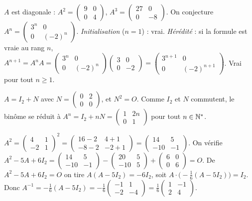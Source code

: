 $A$ est diagonale : $A^2=\begin{pmatrix}9&0\\0&4\end{pmatrix}$, $A^3=\begin{pmatrix}27&0\\0&-8\end{pmatrix}$.
On conjecture $A^n=\begin{pmatrix}3^n&0\\0&(-2)^n\end{pmatrix}$.
\emph{Initialisation} ($n=1$) : vrai. \emph{Hérédité} : si la formule est vraie au rang $n$,
$A^{n+1}=A^n A=\begin{pmatrix}3^n&0\\0&(-2)^n\end{pmatrix}\begin{pmatrix}3&0\\0&-2\end{pmatrix}
=\begin{pmatrix}3^{n+1}&0\\0&(-2)^{n+1}\end{pmatrix}$. Vrai pour tout $n\ge1$.

$A=I_2+N$ avec $N=\begin{pmatrix}0&2\\0&0\end{pmatrix}$, et $N^2=O$. Comme $I_2$ et $N$ commutent,
le binôme se réduit à $A^n=I_2+nN=\begin{pmatrix}1&2n\\0&1\end{pmatrix}$ pour tout $n\in\mathbb{N}^*$.

$A^2=\begin{pmatrix}4&1\\-2&1\end{pmatrix}^2
=\begin{pmatrix}16-2&4+1\\-8-2&-2+1\end{pmatrix}=\begin{pmatrix}14&5\\-10&-1\end{pmatrix}$.
On vérifie $A^2-5A+6I_2=\begin{pmatrix}14&5\\-10&-1\end{pmatrix}-\begin{pmatrix}20&5\\-10&5\end{pmatrix}
+\begin{pmatrix}6&0\\0&6\end{pmatrix}=O$. De $A^2-5A+6I_2=O$ on tire $A(A-5I_2)=-6I_2$, soit
$A\cdot\big(-\tfrac16(A-5I_2)\big)=I_2$. Donc $A^{-1}=-\tfrac16(A-5I_2)
=-\tfrac16\begin{pmatrix}-1&1\\-2&-4\end{pmatrix}=\tfrac16\begin{pmatrix}1&-1\\2&4\end{pmatrix}$.

